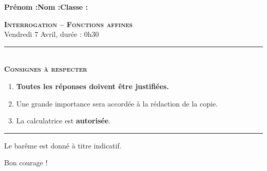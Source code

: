 \documentclass[11pt]{article}
\begin{document}

\textbf{Prénom :}\hfill\textbf{Nom :}\hfill\textbf{Classe :}\\
\begin{center}
\textbf{\LARGE \textsc{Interrogation -- Fonctions affines}}\\[2mm]

{\large Vendredi 7 Avril, durée : 0h30}\\[1mm]
\noindent\rule{8cm}{0.4pt}\\[1mm]
\textbf{\textsc{Consignes à respecter}}
\begin{enumerate}[label=\textbf{\arabic*/}]
\item \textbf{Toutes les réponses doivent être justifiées.}
\item Une grande importance sera accordée à la rédaction de la
  copie.
\item La calculatrice est \textbf{autorisée}.
    \end{enumerate}
\noindent\rule{12cm}{0.4pt}
\end{center}

\vspace{2mm}
\noindent Le barême est donné à titre indicatif.
\vspace{2mm}
\begin{center}
  Bon courage !
\end{center}

%
\end{document}
